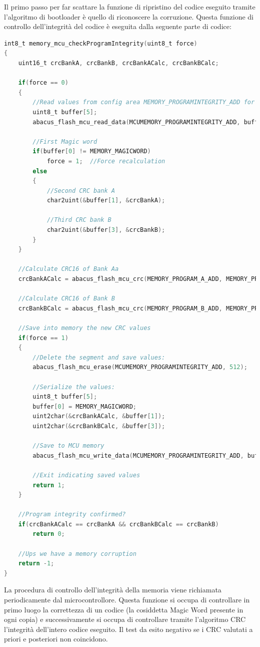 \documentclass[LaM,binding=0.6cm,oneside]{../sapthesis}
\begin{document}
Il primo passo per far scattare la funzione di ripristino del codice eseguito tramite l'algoritmo di bootloader è quello di riconoscere la corruzione. Questa funzione di controllo dell'integrità del codice è eseguita dalla seguente parte di codice:
\begin{small}
\begin{lstlisting}[language=C]
    int8_t memory_mcu_checkProgramIntegrity(uint8_t force)
{
    uint16_t crcBankA, crcBankB, crcBankACalc, crcBankBCalc;

    if(force == 0)
    {
        //Read values from config area MEMORY_PROGRAMINTEGRITY_ADD for banks A and B
        uint8_t buffer[5];
        abacus_flash_mcu_read_data(MCUMEMORY_PROGRAMINTEGRITY_ADD, buffer, 5);

        //First Magic word
        if(buffer[0] != MEMORY_MAGICWORD)
            force = 1;  //Force recalculation
        else
        {
            //Second CRC bank A
            char2uint(&buffer[1], &crcBankA);

            //Third CRC bank B
            char2uint(&buffer[3], &crcBankB);
        }
    }

    //Calculate CRC16 of Bank Aa
    crcBankACalc = abacus_flash_mcu_crc(MEMORY_PROGRAM_A_ADD, MEMORY_PROGRAM_A_SIZE);

    //Calculate CRC16 of Bank B
    crcBankBCalc = abacus_flash_mcu_crc(MEMORY_PROGRAM_B_ADD, MEMORY_PROGRAM_B_SIZE);

    //Save into memory the new CRC values
    if(force == 1)
    {
        //Delete the segment and save values:
        abacus_flash_mcu_erase(MCUMEMORY_PROGRAMINTEGRITY_ADD, 512);

        //Serialize the values:
        uint8_t buffer[5];
        buffer[0] = MEMORY_MAGICWORD;
        uint2char(&crcBankACalc, &buffer[1]);
        uint2char(&crcBankBCalc, &buffer[3]);

        //Save to MCU memory
        abacus_flash_mcu_write_data(MCUMEMORY_PROGRAMINTEGRITY_ADD, buffer, 5);

        //Exit indicating saved values
        return 1;
    }

    //Program integrity confirmed?
    if(crcBankACalc == crcBankA && crcBankBCalc == crcBankB)
        return 0;

    //Ups we have a memory corruption
    return -1;
}
\end{lstlisting}
\end{small}
La procedura di controllo dell'integrità della memoria viene richiamata periodicamente dal microcontrollore. Questa funzione si occupa di controllare in primo luogo la correttezza di un codice (la cosiddetta Magic Word presente in ogni copia) e successivamente si occupa di controllare tramite l'algoritmo CRC l'integrità dell'intero codice eseguito. Il test da esito negativo se i CRC valutati a priori e posteriori non coincidono.
\end{document}
